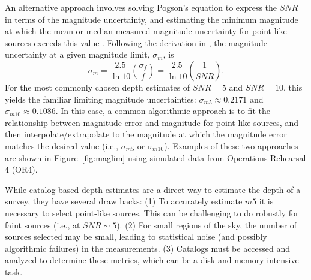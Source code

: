 \documentclass[DM,authoryear,toc]{lsstdoc}
\begin{document}
An alternative approach involves solving Pogson's equation \citep{Pogson:1856} to express the $SNR$ in terms of the magnitude uncertainty, and estimating the minimum magnitude at which the mean or median measured magnitude uncertainty for point-like sources exceeds this value \citep{Rykoff:2015}. Following the derivation in \citet{Rykoff:2015}, the magnitude uncertainty at a given magnitude limit, $\sigma_m$, is 
\begin{equation}
\sigma_m = \frac{2.5}{\ln 10} \left(\frac{\sigma_f}{f} \right) = \frac{2.5}{\ln 10} \left(\frac{1}{SNR}\right).
\end{equation}
For the most commonly chosen depth estimates of $SNR = 5$ and $SNR = 10$, this yields the familiar limiting magnitude uncertainties: $\sigma_{m5} \approx 0.2171$ and $\sigma_{m10} \approx 0.1086$. In this case, a common algorithmic approach is to fit the relationship between magnitude error and magnitude for point-like sources, and then interpolate/extrapolate to the magnitude at which the magnitude error matches the desired value (i.e., $\sigma_{m5}$ or $\sigma_{m10}$).
Examples of these two approaches are shown in Figure~\ref{fig:maglim} using simulated data from Operations Rehearsal 4 (OR4).

While catalog-based depth estimates are a direct way to estimate the depth of a survey, they have several draw backs: (1) To accurately estimate $m5$ it is necessary to select point-like sources. This can be challenging to do robustly for faint sources (i.e., at ${SNR} \sim 5$). (2) For small regions of the sky, the number of sources selected may be small, leading to statistical noise (and possibly algorithmic failures) in the measurements. (3) Catalogs must be accessed and analyzed to determine these metrics, which can be a disk and memory intensive task. 
\end{document}
